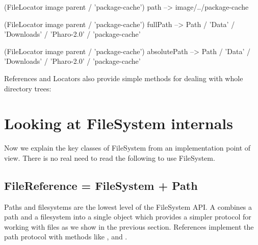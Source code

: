 \documentclass[a4paper,10pt,twoside]{book}
\begin{document}
\begin{code}{}
(FileLocator image parent / 'package-cache') path
--> {image}/../package-cache

(FileLocator image parent / 'package-cache') fullPath
--> Path / 'Data' / 'Downloads' / 'Pharo-2.0' / 'package-cache'

(FileLocator image parent / 'package-cache') absolutePath
--> Path / 'Data' / 'Downloads' / 'Pharo-2.0' / 'package-cache'
\end{code}

References and Locators also provide simple methods for dealing with whole directory trees:

%
%
%
%
%
%
%


\section{Looking at FileSystem internals}
Now we explain the key classes of FileSystem from an implementation point of view. There is no real need to read the following to use FileSystem.  

\subsection{FileReference = FileSystem + Path}
Paths and filesystems are the lowest level of the FileSystem API. A  combines a path and a filesystem into a single object which provides a simpler protocol for working with files as we show in the previous section. References implement the path protocol with methods like \ct{/},  and .
\end{document}
